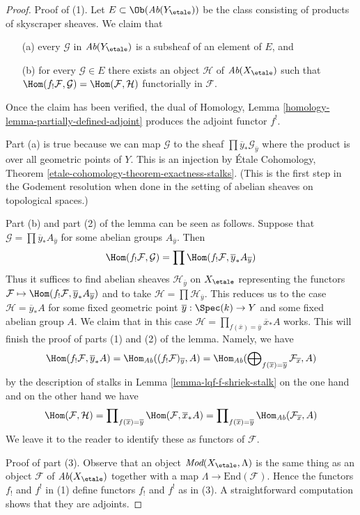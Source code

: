 \begin{proof}
Proof of (1). Let $E \subset \Ob(\textit{Ab}(Y_\etale))$ be the class
consisting of products of skyscraper sheaves. We claim that
\begin{enumerate}
\item[(a)] every $\mathcal{G}$ in $\textit{Ab}(Y_\etale)$ is a subsheaf
of an element of $E$, and
\item[(b)] for every $\mathcal{G} \in E$ there exists an object
$\mathcal{H}$ of $\textit{Ab}(X_\etale)$ such that
$\Hom(f_!\mathcal{F}, \mathcal{G}) = \Hom(\mathcal{F}, \mathcal{H})$
functorially in $\mathcal{F}$.
\end{enumerate}
Once the claim has been verified, the dual of
Homology, Lemma \ref{homology-lemma-partially-defined-adjoint}
produces the adjoint functor $f^!$.

\medskip\noindent
Part (a) is true because we can map $\mathcal{G}$ to the sheaf
$\prod \overline{y}_*\mathcal{G}_{\overline{y}}$ where the
product is over all geometric points of $Y$. This is an injection by
\'Etale Cohomology, Theorem \ref{etale-cohomology-theorem-exactness-stalks}.
(This is the first step in the Godement resolution when
done in the setting of abelian sheaves on topological spaces.)

\medskip\noindent
Part (b) and part (2) of the lemma can be seen as follows.
Suppose that $\mathcal{G} = \prod \overline{y}_*A_{\overline{y}}$
for some abelian groups $A_{\overline{y}}$. Then
$$
\Hom(f_!\mathcal{F}, \mathcal{G}) =
\prod \Hom(f_!\mathcal{F}, \overline{y}_*A_{\overline{y}})
$$
Thus it suffices to find abelian sheaves $\mathcal{H}_{\overline{y}}$
on $X_\etale$ representing the functors
$\mathcal{F} \mapsto \Hom(f_!\mathcal{F}, \overline{y}_*A_{\overline{y}})$
and to take $\mathcal{H} = \prod \mathcal{H}_{\overline{y}}$.
This reduces us to the case $\mathcal{H} = \overline{y}_*A$
for some fixed geometric point $\overline{y} : \Spec(k) \to Y$
and some fixed abelian group $A$. We claim that in this case
$\mathcal{H} = \prod_{f(\overline{x}) = \overline{y}} \overline{x}_*A$ works.
This will finish the proof of parts (1) and (2) of the lemma.
Namely, we have
$$
\Hom(f_!\mathcal{F}, \overline{y}_*A) =
\Hom_{\textit{Ab}}((f_!\mathcal{F})_{\overline{y}}, A) =
\Hom_{\textit{Ab}}(\bigoplus\nolimits_{f(\overline{x}) = \overline{y}}
\mathcal{F}_{\overline{x}}, A)
$$
by the description of stalks in
Lemma \ref{lemma-lqf-f-shriek-stalk}
on the one hand and on the other hand we have
$$
\Hom(\mathcal{F}, \mathcal{H}) =
\prod\nolimits_{f(\overline{x}) = \overline{y}}
\Hom(\mathcal{F}, \overline{x}_*A) =
\prod\nolimits_{f(\overline{x}) = \overline{y}}
\Hom_{\textit{Ab}}(\mathcal{F}_{\overline{x}}, A)
$$
We leave it to the reader to identify these as functors of $\mathcal{F}$.

\medskip\noindent
Proof of part (3). Observe that an object $\textit{Mod}(X_\etale, \Lambda)$
is the same thing as an object $\mathcal{F}$ of $\textit{Ab}(X_\etale)$
together with a map $\Lambda \to \text{End}(\mathcal{F})$. Hence the
functors $f_!$ and $f^!$ in (1) define functors $f_!$ and $f^!$ as in (3).
A straightforward computation shows that they are adjoints.
\end{proof}

